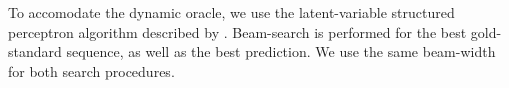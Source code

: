 \documentclass[11pt,letterpaper]{article}
\begin{document}
To accomodate the dynamic oracle, we use the latent-variable structured perceptron
algorithm described by \citet{sun:09}.
Beam-search is performed for the best gold-standard
sequence, as well as the best prediction. We use the same beam-width for both
search procedures.
%
\end{document}
